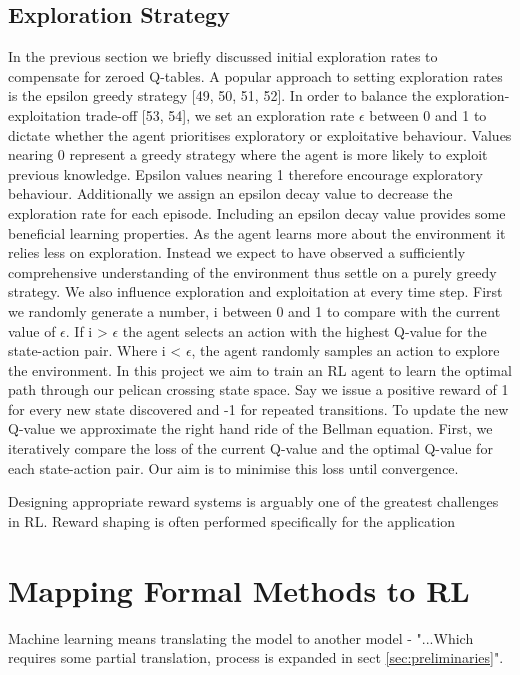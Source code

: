 \documentclass[runningheads]{llncs}
\begin{document}
\subsection{Exploration Strategy}
In the previous section we briefly discussed initial exploration rates to compensate for
zeroed Q-tables. A popular approach to setting exploration rates is the epsilon greedy
strategy [49, 50, 51, 52]. In order to balance the exploration-exploitation trade-off [53, 54],
we set an exploration rate $\epsilon$ between 0 and 1 to dictate whether the agent prioritises
exploratory or exploitative behaviour. Values nearing 0 represent a greedy strategy where
the agent is more likely to exploit previous knowledge. Epsilon values nearing 1 therefore
encourage exploratory behaviour. Additionally we assign an epsilon decay value to
decrease the exploration rate for each episode. Including an epsilon decay value provides
some beneficial learning properties. As the agent learns more about the environment it
relies less on exploration. Instead we expect to have observed a sufficiently comprehensive
understanding of the environment thus settle on a purely greedy strategy. We also
influence exploration and exploitation at every time step. First we randomly generate
a number, i between 0 and 1 to compare with the current value of $\epsilon$. If i > $\epsilon$ the agent
selects an action with the highest Q-value for the state-action pair. Where i < $\epsilon$, the agent
randomly samples an action to explore the environment.
In this project we aim to train an RL agent to learn the optimal path through our
pelican crossing state space. Say we issue a positive reward of 1 for every new state
discovered and -1 for repeated transitions. To update the new Q-value we approximate
the right hand ride of the Bellman equation. First, we iteratively compare the loss of
the current Q-value and the optimal Q-value for each state-action pair. Our aim is to
minimise this loss until convergence.


Designing appropriate reward systems is arguably one of the greatest challenges in RL. Reward shaping is often performed specifically for the application


\section{Mapping Formal Methods to RL}
Machine learning means translating the model to another model - "...Which requires some partial translation, process is expanded in sect \ref{sec:preliminaries}".
\end{document}
